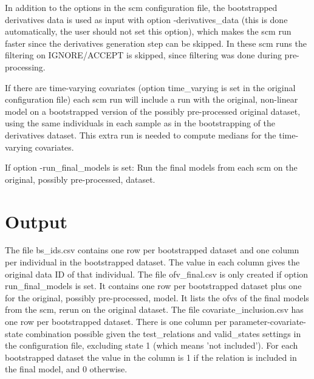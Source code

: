 In addition to the options in the scm configuration file, 
the bootstrapped derivatives data is used as input with option -derivatives\_data (this is done automatically, the user should not set this option), 
which makes the scm run faster since the derivatives generation step can be skipped. In these scm runs the filtering on IGNORE/ACCEPT is skipped, 
since filtering was done during pre-processing. 

If there are time-varying covariates (option time\_varying is set in the original configuration file) each scm run will include a run with the 
original, non-linear model on a bootstrapped version of the possibly pre-processed original dataset, 
using the same individuals in each sample as in the bootstrapping of the derivatives dataset. 
This extra run is needed to compute medians for the time-varying covariates. 

If option -run\_final\_models is set: Run the final models from each scm on the original, possibly pre-processed, dataset.

\section{Output}

The file bs\_ids.csv contains one row per bootstrapped dataset and one column per individual in the bootstrapped dataset. 
The value in each column gives the original data ID of that individual.
The file ofv\_final.csv is only created if option run\_final\_models is set. It contains one row per bootstrapped dataset plus one for the original, 
possibly pre-processed, model. It lists the ofvs of the final models from the scm, rerun on the original dataset.
The file covariate\_inclusion.csv has one row per bootstrapped dataset. There is one column per parameter-covariate-state combination possible given 
the test\_relations and valid\_states settings in the configuration file, excluding state 1 (which means 'not included'). 
For each bootstrapped dataset the value in the column is 1 if the relation is included in the final model, and 0 otherwise.



